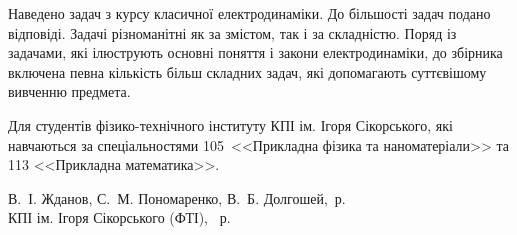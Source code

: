 {\begin{alwayssingle}
		Наведено  задач з курсу класичної електродинаміки. До більшості задач подано відповіді. Задачі різноманітні як за змістом, так і за складністю. Поряд із задачами, які ілюструють основні поняття і закони електродинаміки, до збірника включена певна кількість більш складних задач, які допомагають суттєвішому вивченню предмета.

		Для студентів фізико-технічного інституту КПІ ім. Ігоря Сікорського, які навчаються за спеціальностями 105~<<Прикладна фізика та наноматеріали>> та 113 <<Прикладна математика>>.

		\vfill

	\hfill
	\begin{minipage}[t]{0.65\linewidth}\small
        \textcopyright{} В.~І. Жданов, С.~М. Пономаренко, В.~Б. Долгошей, \the\year\,р. \\
        \textcopyright{}  КПІ ім. Ігоря Сікорського (ФТІ), \the\year~р.
    \end{minipage}
		\newpage%
	\end{alwayssingle}
}

